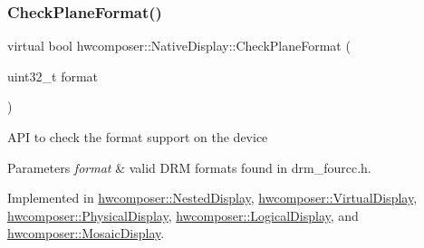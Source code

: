 \begin{DoxyCode}{0}
\end{DoxyCode}
\mbox{\label{classhwcomposer_1_1NativeDisplay_a4e856b5754054bdf77467e6663cb5b50}} 
\subsubsection{\texorpdfstring{Check\+Plane\+Format()}{CheckPlaneFormat()}}
{\footnotesize\ttfamily virtual bool hwcomposer\+::\+Native\+Display\+::\+Check\+Plane\+Format (\begin{DoxyParamCaption}\item[{uint32\+\_\+t}]{format }\end{DoxyParamCaption})\hspace{0.3cm}{\ttfamily [pure virtual]}}

A\+PI to check the format support on the device 
\begin{DoxyParams}{Parameters}
{\em format} & valid D\+RM formats found in drm\+\_\+fourcc.\+h. \\
\hline
\end{DoxyParams}


Implemented in \mbox{\hyperlink{classhwcomposer_1_1NestedDisplay_a5e44d76d34b86354540abbee20ab046d}{hwcomposer\+::\+Nested\+Display}}, \mbox{\hyperlink{classhwcomposer_1_1VirtualDisplay_a236888c443de310b6e0f23f575fd9d75}{hwcomposer\+::\+Virtual\+Display}}, \mbox{\hyperlink{classhwcomposer_1_1PhysicalDisplay_ad4986df79c02c4c30e205065028cc050}{hwcomposer\+::\+Physical\+Display}}, \mbox{\hyperlink{classhwcomposer_1_1LogicalDisplay_ae54b9d9a1d980ed587f43aef1c2a6f2c}{hwcomposer\+::\+Logical\+Display}}, and \mbox{\hyperlink{classhwcomposer_1_1MosaicDisplay_a8978685de8d614113e49b3b774c9b723}{hwcomposer\+::\+Mosaic\+Display}}.

